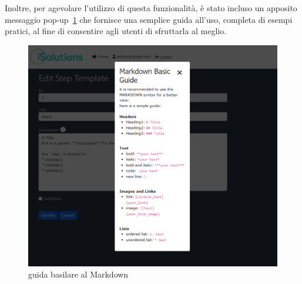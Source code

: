 Inoltre, per agevolare l'utilizzo di questa funzionalità, è stato incluso un apposito 
messaggio pop-up~\ref{fig:markdownGuide} che fornisce una semplice guida all'uso, completa di esempi pratici, 
al fine di consentire agli utenti di sfruttarla al meglio.

\begin{figure}[H]
	\centering
	\includegraphics[width=\textwidth]{img/markdownGuide.png}
	\caption{guida basilare al Markdown}
	\label{fig:markdownGuide}
\end{figure}